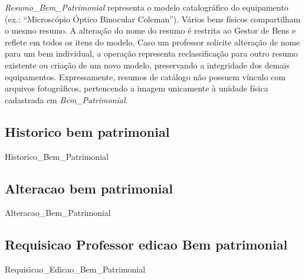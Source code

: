 \begin{explicacao}
\textit{Resumo\_Bem\_Patrimonial} representa o modelo catalográfico do equipamento (ex.: ``Microscópio Óptico Binocular Coleman''). Vários bens físicos compartilham o mesmo resumo. A alteração do nome do resumo é restrita ao Gestor de Bens e reflete em todos os itens do modelo. Caso um professor solicite alteração de nome para um bem individual, a operação representa reclassificação para outro resumo existente ou criação de um novo modelo, preservando a integridade dos demais equipamentos. Expressamente, resumos de catálogo não possuem vínculo com arquivos fotográficos, pertencendo a imagem unicamente à unidade física cadastrada em \textit{Bem\_Patrimonial}.
\end{explicacao}
\newpage
\subsection{Historico bem patrimonial}
\begin{entidade}{Historico\_Bem\_Patrimonial}
\end{entidade}

\subsection{Alteracao bem patrimonial}
\begin{entidade}{Alteracao\_Bem\_Patrimonial}
\end{entidade}
\newpage
\subsection{Requisicao Professor edicao Bem patrimonial}
\begin{entidade}{Requisicao\_Edicao\_Bem\_Patrimonial}
\end{entidade}

